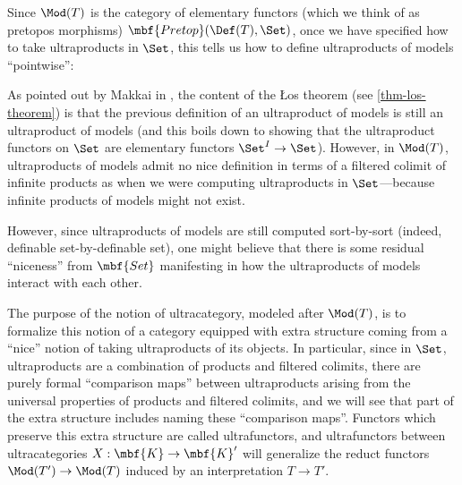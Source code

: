 Since $\Mod(T)$ is the category of elementary functors (which we think of as pretopos morphisms) $\mbf{Pretop}(\Def(T), \Set)$, once we have specified how to take ultraproducts in $\Set$, this tells us how to define ultraproducts of models ``pointwise'':


  As pointed out by Makkai in \cite{makkai-sdfol}, the content of the {\L}os theorem (see \ref{thm-los-theorem}) is that the previous definition of an ultraproduct of models is still an ultraproduct of models (and this boils down to showing that the ultraproduct functors on $\Set$ are elementary functors $\Set^I \to \Set$). However, in $\Mod(T)$, ultraproducts of models admit no nice definition in terms of a filtered colimit of infinite products as when we were computing ultraproducts in $\Set$---because infinite products of models might not exist.

  However, since ultraproducts of models are still computed sort-by-sort (indeed, definable set-by-definable set), one might believe that there is some residual ``niceness'' from $\mbf{Set}$ manifesting in how the ultraproducts of models interact with each other.

The purpose of the notion of ultracategory, modeled after $\Mod(T)$, is to formalize this notion of a category equipped with extra structure coming from a ``nice'' notion of taking ultraproducts of its objects. In particular, since in $\Set$, ultraproducts are a combination of products and filtered colimits, there are purely formal ``comparison maps'' between ultraproducts arising from the universal properties of products and filtered colimits, and we will see that part of the extra structure includes naming these ``comparison maps''. Functors which preserve this extra structure are called ultrafunctors, and ultrafunctors between ultracategories $X : \mbf{K} \to \mbf{K}'$ will generalize the reduct functors $\Mod(T') \to \Mod(T)$ induced by an interpretation $T \to T'$.

